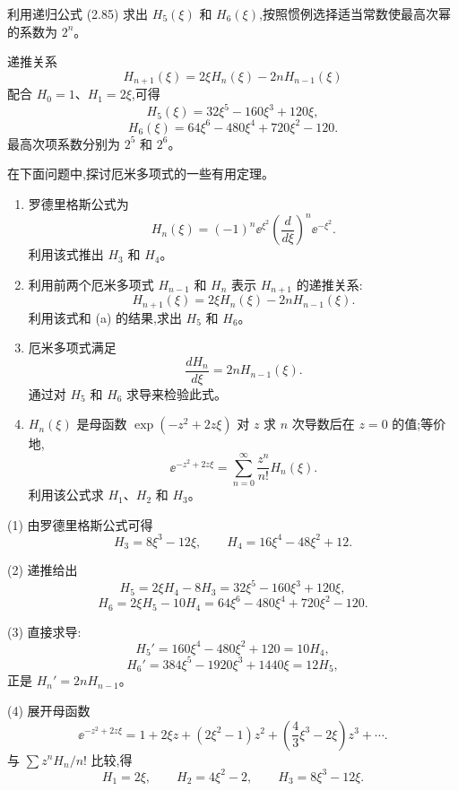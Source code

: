 \begin{question}
利用递归公式 (2.85) 求出 $H_5(\xi)$ 和 $H_6(\xi)$,按照惯例选择适当常数使最高次幂的系数为 $2^n$。

\par\smallskip
{}

\end{question}
\begin{solution}
递推关系
\[
H_{n+1}(\xi)=2\xi H_n(\xi)-2nH_{n-1}(\xi)
\]
配合 $H_0=1$、$H_1=2\xi$,可得
\[
H_5(\xi)=32\xi^5-160\xi^3+120\xi,
\]
\[
H_6(\xi)=64\xi^6-480\xi^4+720\xi^2-120.
\]
最高次项系数分别为 $2^5$ 和 $2^6$。
\end{solution}

\begin{question}
在下面问题中,探讨厄米多项式的一些有用定理。
\begin{enumerate}
\item 罗德里格斯公式为
\[
H_n(\xi)=(-1)^n \ee^{\xi^2}\left(\frac{d}{d\xi}\right)^n \ee^{-\xi^2} .
\]
利用该式推出 $H_3$ 和 $H_4$。
\item 利用前两个厄米多项式 $H_{n-1}$ 和 $H_n$ 表示 $H_{n+1}$ 的递推关系:
\[
H_{n+1}(\xi)=2\xi H_n(\xi)-2nH_{n-1}(\xi).
\]
利用该式和 (a) 的结果,求出 $H_5$ 和 $H_6$。
\item 厄米多项式满足
\[
\frac{dH_n}{d\xi}=2nH_{n-1}(\xi).
\]
通过对 $H_5$ 和 $H_6$ 求导来检验此式。
\item $H_n(\xi)$ 是母函数 $\exp(-z^2+2z\xi)$ 对 $z$ 求 $n$ 次导数后在 $z=0$ 的值;等价地,
\[
\ee^{-z^2+2z\xi}=\sum_{n=0}^{\infty}\frac{z^n}{n!}H_n(\xi).
\]
利用该公式求 $H_1$、$H_2$ 和 $H_3$。
\end{enumerate}
\end{question}
\begin{solution}
(1) 由罗德里格斯公式可得
\[
H_3=8\xi^3-12\xi,
\qquad
H_4=16\xi^4-48\xi^2+12.
\]

(2) 递推给出
\[
H_5=2\xi H_4-8H_3=32\xi^5-160\xi^3+120\xi,
\]
\[
H_6=2\xi H_5-10H_4=64\xi^6-480\xi^4+720\xi^2-120.
\]

(3) 直接求导:
\[
H_5'=160\xi^4-480\xi^2+120=10H_4,
\]
\[
H_6'=384\xi^5-1920\xi^3+1440\xi=12H_5,
\]
正是 $H_n'=2nH_{n-1}$。

(4) 展开母函数
\[
\ee^{-z^2+2z\xi}=1+2\xi z+(2\xi^2-1)z^2+\left(\frac43\xi^3-2\xi\right)z^3+\cdots.
\]
与 $\sum z^nH_n/n!$ 比较,得
\[
H_1=2\xi,
\qquad H_2=4\xi^2-2,
\qquad H_3=8\xi^3-12\xi.
\]
\end{solution}

